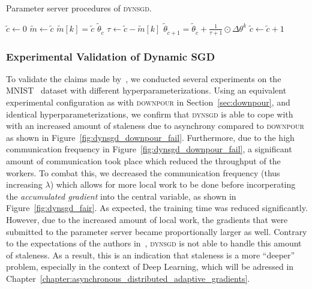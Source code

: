 \begin{algorithm}[H]
  \caption{Parameter server procedures of \textsc{dynsgd}.}
  \label{algo:dynsgd_parameter_server}
  \begin{algorithmic}[1]
    \State $\tilde{c} \gets 0$ 
    \State $\tilde{m} \gets \tilde{c}$ 
    \State
     
    \State $\tilde{m}[k] = \tilde{c}$
    \State \Return $\tilde{\theta}_{\tilde{c}}$
    \EndProcedure
    \State
    \State $\tau \gets \tilde{c} - \tilde{m}[k]$
    \State $\tilde{\theta}_{\tilde{c} + 1} = \tilde{\theta}_{\tilde{c}} + \frac{1}{\tau + 1} \odot \Delta\theta^k$  
    \State $\tilde{c} \gets \tilde{c} + 1$
    \EndProcedure
    \State
    \EndProcedure
  \end{algorithmic}
\end{algorithm}

\subsubsection{Experimental Validation of Dynamic SGD}
\label{sec:dynsgd_validation}

To validate the claims made by~\cite{jiang2017heterogeneity}, we conducted several experiments on the MNIST~\cite{mnist} dataset with different hyperparameterizations. Using an equivalent experimental configuration as with \textsc{downpour} in Section~\ref{sec:downpour}, and identical hyperparameterizations, we confirm that \textsc{dynsgd} is able to cope with with an increased amount of staleness due to asynchrony compared to \textsc{downpour} as shown in Figure~\ref{fig:dynsgd_downpour_fail}. Furthermore, due to the high communication frequency in Figure~\ref{fig:dynsgd_downpour_fail}, a significant amount of communication took place which reduced the throughput of the workers. To combat this, we decreased the communication frequency (thus increasing $\lambda$) which allows for more local work to be done before incorperating the \emph{accumulated gradient} into the central variable, as shown in Figure~\ref{fig:dynsgd_fair}. As expected, the training time was reduced significantly. However, due to the increased amount of local work, the gradients that were submitted to the parameter server became proportionally larger as well. Contrary to the expectations of the authors in~\cite{jiang2017heterogeneity}, \textsc{dynsgd} is not able to handle this amount of staleness. As a result, this is an indication that staleness is a more ``deeper'' problem, especially in the context of Deep Learning, which will be adressed in Chapter~\ref{chapter:asynchronous_distributed_adaptive_gradients}.

